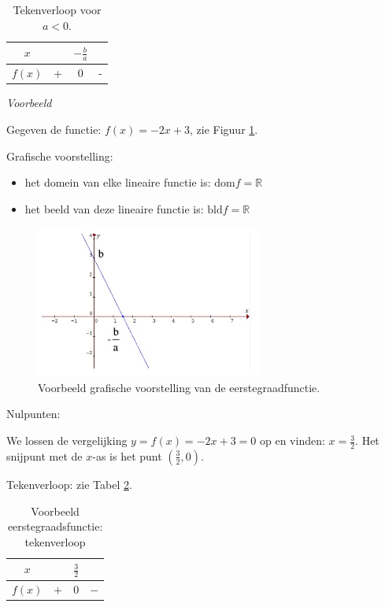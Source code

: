 \begin{table}[h]
	\centering\begin{tabular}{c||c|c|c}
		$x$ &  & $-\frac{b}{a}$ & \\
		\hline 
		$f(x)$ & + & 0 & -\\
	\end{tabular}
	\caption{Tekenverloop voor $a<0$.}
	\label{tab:eerst_akl0}
\end{table}

\emph{Voorbeeld}

Gegeven de functie: $f(x)=-2x+3$, zie Figuur \ref{fig:eerste_vb_graf}.

Grafische voorstelling:
\begin{itemize}
\item het domein van elke lineaire functie is: $\textrm{dom}f=\mathbb{R}$
\item het beeld van deze lineaire functie is: $\textrm{bld}f=\mathbb{R}$
\end{itemize}
\begin{figure}[h]
\centering{}\includegraphics[height=5cm]{2_elem_rekenvaardigheden_B/inputs/eerstegraadsfuncties3.jpg}
\caption{Voorbeeld grafische voorstelling van de eerstegraadfunctie.}
\label{fig:eerste_vb_graf} 
\end{figure}


Nulpunten:

\noindent We lossen de vergelijking $y=f(x)=-2x+3=0$ op en vinden:
$x=\frac{3}{2}$. Het snijpunt met de $x$-as is het punt $(\frac{3}{2},0)$.

Tekenverloop: zie Tabel \ref{tab:eerste_vb}.

\begin{table}[h]
\centering
\begin{tabular}{c||c|c|c}
	$x$ &  & $\frac{3}{2}$ & \\
	\hline 
	$f(x)$ & $+$ & 0 & $-$\\
\end{tabular}
\caption{Voorbeeld eerstegraadsfunctie: tekenverloop}
\label{tab:eerste_vb}	
\end{table}


